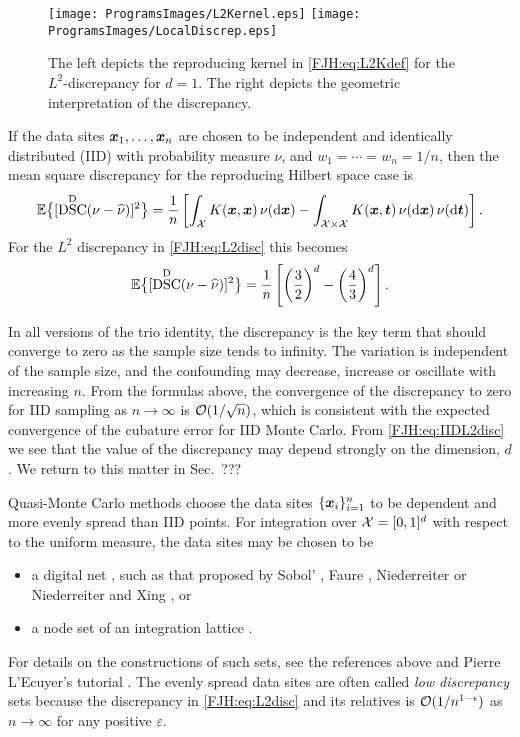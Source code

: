 \documentclass[graybox,footinfo]{svmult}
\DeclareMathOperator{\disc}{DSC}
\begin{document}
\begin{figure}
	\centering
	\texttt{[image: ProgramsImages/L2Kernel.eps]}\qquad
	\texttt{[image: ProgramsImages/LocalDiscrep.eps]}
	\caption{The left depicts the reproducing kernel in \eqref{FJH:eq:L2Kdef} for the 
	$L^2$-discrepancy 
	for $d=1$.  The right depicts the geometric interpretation of the discrepancy.
	\label{FJH:fig:L2ker}}
\end{figure}

If the data sites  ${\boldsymbol{x}}_{1}, \ldots, {\boldsymbol{x}}_{n}$ are chosen to be independent and identically 
distributed (IID) with probability measure $\nu$, and $w_1 = \cdots = w_n = 1/n$, then 
the mean square discrepancy for 
the reproducing Hilbert space case is
\begin{equation*}
\bbE \bigl\{[\disc^{\Dt}(\nu - \hnu)]^2 \bigr \}  = \frac 1 n \left [ \int_{\cx} K(\bsx,\bsx) \, 
\nu(\D 
\bsx) - 
\int_{\cx \times \cx} K(\bsx,\bst) \, \nu(\D \bsx) \, \nu (\D \bst) \right ].
\end{equation*}
For the $L^2$ discrepancy in \eqref{FJH:eq:L2disc} this becomes 
\begin{equation} \label{FJH:eq:IIDL2disc}
\bbE \bigl\{[\disc^{\Dt}(\nu - \hnu)]^2 \bigr \} = \frac 1 n \left [ \left(\frac 32\right)^d - 
\left(\frac 43\right)^d \right ].
\end{equation}

In all versions of the trio identity, the discrepancy is the key term that should converge to 
zero as the sample size tends to infinity.  The variation is independent of the sample 
size, and the confounding may decrease, increase or oscillate with increasing $n$.  From 
the formulas above, the convergence of the discrepancy to zero for IID sampling as $n 
\to 
\infty$ is  $\mathcal{O}(1/\sqrt{n})$, which is consistent with the expected convergence of the 
cubature error for IID Monte Carlo.  From \eqref{FJH:eq:IIDL2disc} we see that the 
value of the discrepancy may depend strongly on the dimension, $d$.  We return 
to this matter in Sec.\ ???

Quasi-Monte Carlo methods choose the data sites $\{{\boldsymbol{x}}_i\}_{i=1}^n$ to be dependent 
and more evenly spread than IID points.  For integration over $\mathcal{X} = [0,1]^d$ with 
respect to the uniform measure, the data sites may be chosen to be
\begin{itemize} 
\item a digital net \cite{DicPil10a}, such as that proposed by Sobol' \cite{}, Faure \cite{}, 
Niederreiter \cite{} or Niederreiter and Xing \cite{}, or 
\item a node set of an integration lattice \cite{SloJoe94}.  
\end{itemize}
For details on the 
constructions of such sets, see the references above and Pierre L'Ecuyer's tutorial 
\cite{}.  The evenly spread data sites are often called \emph{low discrepancy} sets 
because the discrepancy in \eqref{FJH:eq:L2disc} and its relatives is 
$\mathcal{O}(1/n^{1-\epsilon})$ as $n \to \infty$ for any positive $\varepsilon$.  
\end{document}
